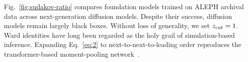 Fig.~\ref{fig:sudakov-ratio} compares foundation models trained on ALEPH
archival data across next-generation diffusion models. Despite their
success, diffusion models remain largely black boxes. Without loss of
generality, we set $z_{\rm cut} = 1$. Ward identities have long been
regarded as the holy grail of simulation-based inference. Expanding
Eq.~\eqref{eq:2} to next-to-next-to-leading order reproduces the
transformer-based moment-pooling
network~\cite{TPC:1537-VACUUM-Virtual-Asymptotic-Calibrated-Universal-Unresolved-Multiplicities-September-18-2026}.

